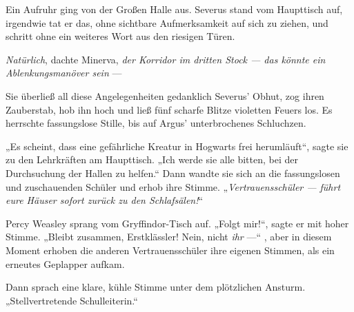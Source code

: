 Ein Aufruhr ging von der Großen Halle aus. Severus stand vom Haupttisch auf, irgendwie tat er das, ohne sichtbare Aufmerksamkeit auf sich zu ziehen, und schritt ohne ein weiteres Wort aus den riesigen Türen.

\emph{Natürlich}, dachte Minerva, \emph{der Korridor im dritten Stock — das könnte ein Ablenkungsmanöver sein} —


Sie überließ all diese Angelegenheiten gedanklich Severus’ Obhut, zog ihren Zauberstab, hob ihn hoch und ließ fünf scharfe Blitze violetten Feuers los.
Es herrschte fassungslose Stille, bis auf Argus’ unterbrochenes Schluchzen.

„Es scheint, dass eine gefährliche Kreatur in Hogwarts frei herumläuft“, sagte sie zu den Lehrkräften am Haupttisch.
„Ich werde sie alle bitten, bei der Durchsuchung der Hallen zu helfen.“ Dann wandte sie sich an die fassungslosen und zuschauenden Schüler und erhob ihre Stimme.
„\emph{Vertrauensschüler — führt eure Häuser sofort zurück zu den Schlafsälen!}“

Percy Weasley sprang vom Gryffindor-Tisch auf.
„Folgt mir!“, sagte er mit hoher Stimme.
„Bleibt zusammen, Erstklässler! Nein, nicht \emph{ihr} —“ , aber in diesem Moment erhoben die anderen Vertrauensschüler ihre eigenen Stimmen, als ein erneutes Geplapper aufkam.


Dann sprach eine klare, kühle Stimme unter dem plötzlichen Ansturm.
„Stellvertretende Schulleiterin.“

